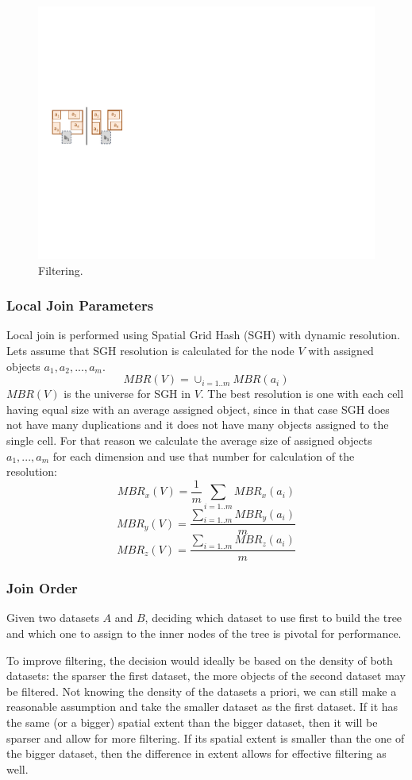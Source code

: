 \documentclass{vldb}
\begin{document}
\begin{figure}
    \centering
    \includegraphics[width=0.48\columnwidth]{figures/filtering}
    \caption{Filtering.}
    \label{fig:filtering}
\end{figure}


\subsubsection{Local Join Parameters}
Local join is performed using Spatial Grid Hash (SGH) with dynamic resolution. Lets assume that SGH resolution is calculated for the node $V$ with assigned objects $a_1,a_2,...,a_m$. 
$$MBR(V) = \cup_{i=1..m} MBR(a_i)$$
$MBR(V)$ is the universe for SGH in $V$. The best resolution is one with each cell having equal size with an average assigned object, since in that case SGH does not have many duplications and it does not have many objects assigned to the single cell. For that reason we calculate the average size of assigned objects $a_1,...,a_m$ for each dimension and use that number for calculation of the resolution:
$$MBR_x(V) = \frac{1}{m}\sum_{i=1..m}MBR_x(a_i)$$
$$MBR_y(V) = \frac{\sum_{i=1..m}MBR_y(a_i)}{m}$$
$$MBR_z(V) = \frac{\sum_{i=1..m}MBR_z(a_i)}{m}$$


\subsubsection{Join Order}
\label{joinorder}
Given two datasets $A$ and $B$, deciding which dataset to use first to build the tree and which one to assign to the inner nodes of the tree is pivotal for
performance.

To improve filtering, the decision would ideally be based on the density of both datasets: the sparser the first dataset, the more objects of the second dataset
may be filtered. Not knowing the density of the datasets a priori, we can still make a reasonable assumption and take the smaller dataset as the first dataset.
If it has the same (or a bigger) spatial extent than the bigger dataset, then it will be sparser and allow for more filtering. If its spatial extent is smaller
than the one of the bigger dataset, then the difference in extent allows for effective filtering as well.
\end{document}
